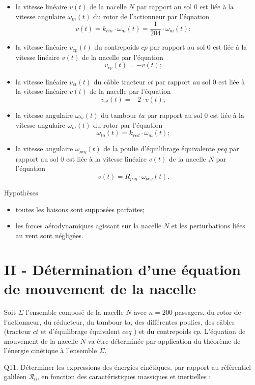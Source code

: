 \documentclass[10pt]{article}
\begin{document}
\begin{itemize}
  \item[-] la vitesse linéaire $v(t)$ de la nacelle $N$ par rapport au sol 0 est liée à la vitesse angulaire $\omega_{m}(t)$ du rotor de l'actionneur par l'équation
$$
v(t)=k_{c i n} \cdot \omega_{m}(t)=\frac{1}{204} \cdot \omega_{m}(t) ;
$$
  \item[-] la vitesse linéaire $v_{c p}(t)$ du contrepoids $c p$ par rapport au sol 0 est liée à la vitesse linéaire $v(t)$ de la nacelle par l'équation
$$
v_{c p}(t)=-v(t) ;
$$
  \item[-] la vitesse linéaire $v_{c t}(t)$ du câble tracteur $c t$ par rapport au sol 0 est liée à la vitesse linéaire $v(t)$ de la nacelle par l'équation
$$
v_{c t}(t)=-2 \cdot v(t) ;
$$
  \item[-] la vitesse angulaire $\omega_{t a}(t)$ du tambour $t a$ par rapport au sol 0 est liée à la vitesse angulaire $\omega_{m}(t)$ du rotor par l'équation
$$
\omega_{t a}(t)=k_{r e d} \cdot \omega_{m}(t) ;
$$
  \item[-] la vitesse angulaire $\omega_{p e q}(t)$ de la poulie d'équilibrage équivalente $p e q$ par rapport au sol 0 est liée à la vitesse linéaire $v(t)$ de la nacelle $N$ par l'équation
$$
v(t)=R_{p e q} \cdot \omega_{p e q}(t) .
$$
\end{itemize}

Hypothèses

\begin{itemize}
  \item[-] toutes les liaisons sont supposées parfaites;
  \item[-] les forces aérodynamiques agissant sur la nacelle $N$ et les perturbations liées au vent sont négligées.
\end{itemize}

\section*{II - Détermination d'une équation de mouvement de la nacelle}
Soit $\Sigma$ l'ensemble composé de la nacelle $N$ avec $n=200$ passagers, du rotor de l'actionneur, du réducteur, du tambour ta, des différentes poulies, des câbles (tracteur $c t$ et d'équilibrage équivalent $c e q$ ) et du contrepoids $c p$. L'équation de mouvement de la nacelle $N$ va être déterminée par application du théorème de l'énergie cinétique à l'ensemble $\Sigma$.

Q11. Déterminer les expressions des énergies cinétiques, par rapport au référentiel galiléen $\mathcal{R}_{0}$, en fonction des caractéristiques massiques et inertielles :
\end{document}
